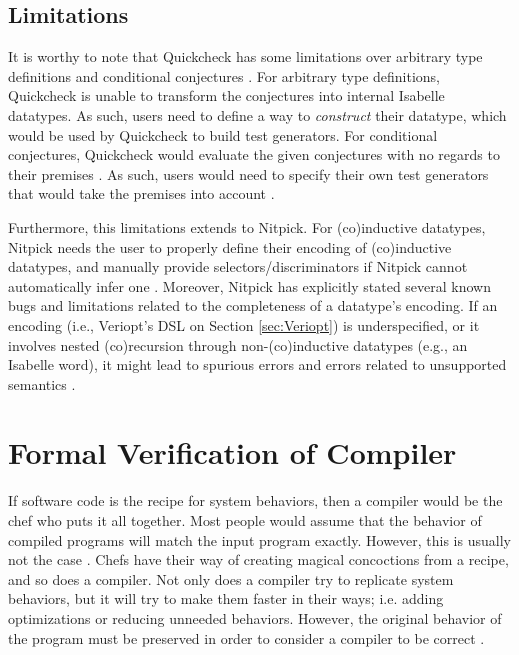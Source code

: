 \subsection{Limitations}
\label{sec:IsabelleLimitations}

It is worthy to note that Quickcheck has some limitations over arbitrary type definitions \cite[Sec. 3.1]{isabelleQuickcheck} 
and conditional conjectures \cite[Sec. 4]{isabelleQuickcheck}. For arbitrary type definitions, Quickcheck is unable to transform the conjectures 
into internal Isabelle datatypes. As such, users need to define a way to \emph{construct} their datatype, which would be used by Quickcheck 
to build test generators. For conditional conjectures, Quickcheck would evaluate the given conjectures with no regards to their premises 
\cite[Sec. 4]{isabelleQuickcheck}. As such, users would need to specify their own test generators that would take the premises into account 
\cite[Sec. 4.1]{isabelleQuickcheck}. 

Furthermore, this limitations extends to Nitpick. For (co)inductive datatypes, Nitpick needs the user to 
properly define their encoding of (co)inductive datatypes, and manually provide selectors/discriminators if Nitpick cannot automatically infer 
one \cite[Sec. 5.4]{isabelleProof}. Moreover, Nitpick has explicitly stated several known bugs and limitations related to the completeness 
of a datatype's encoding. If an encoding (i.e., Veriopt's DSL on Section \ref{sec:Veriopt}) is underspecified, or 
it involves nested (co)recursion through non-(co)inductive datatypes (e.g., an Isabelle word), it might lead to spurious errors and errors 
related to unsupported semantics \cite[Ch. 8]{isabelleNitpick}.

\section{Formal Verification of Compiler}
\label{sec:verification}

If software code is the recipe for system behaviors, then a compiler would be the chef who puts it all together. Most people would assume that 
the behavior of compiled programs will match the input program exactly. However, this is usually not the case \cite{compcertVerification}. 
Chefs have their way of creating magical concoctions from a recipe, and so does a compiler. Not only does a compiler try to replicate 
system behaviors, but it will try to make them faster in their ways; i.e. adding optimizations or reducing unneeded behaviors. However, the 
original behavior of the program must be preserved in order to consider a compiler to be correct 
\cite{compcertVerification,AliveInLean,Alive2,Term_Graph_Optimizations}.

